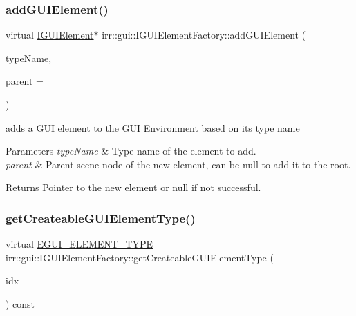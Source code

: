 \subsubsection{\texorpdfstring{add\+G\+U\+I\+Element()}{addGUIElement()}\hspace{0.1cm}{\footnotesize\ttfamily [2/2]}}
{\footnotesize\ttfamily virtual \hyperlink{classirr_1_1gui_1_1IGUIElement}{I\+G\+U\+I\+Element}$\ast$ irr\+::gui\+::\+I\+G\+U\+I\+Element\+Factory\+::add\+G\+U\+I\+Element (\begin{DoxyParamCaption}\item[{const \hyperlink{namespaceirr_a9395eaea339bcb546b319e9c96bf7410}{c8} $\ast$}]{type\+Name,  }\item[{\hyperlink{classirr_1_1gui_1_1IGUIElement}{I\+G\+U\+I\+Element} $\ast$}]{parent = {} }\end{DoxyParamCaption})\hspace{0.3cm}{\ttfamily [pure virtual]}}



adds a G\+UI element to the G\+UI Environment based on its type name 


\begin{DoxyParams}{Parameters}
{\em type\+Name} & Type name of the element to add. \\
\hline
{\em parent} & Parent scene node of the new element, can be null to add it to the root. \\
\hline
\end{DoxyParams}
\begin{DoxyReturn}{Returns}
Pointer to the new element or null if not successful. 
\end{DoxyReturn}
\mbox{\label{classirr_1_1gui_1_1IGUIElementFactory_a9318ddb2d0d971551db4c050c3f99a2f}} 
\subsubsection{\texorpdfstring{get\+Createable\+G\+U\+I\+Element\+Type()}{getCreateableGUIElementType()}}
{\footnotesize\ttfamily virtual \hyperlink{namespaceirr_1_1gui_ae4d66df0ecf4117cdbcf9f22404bd254}{E\+G\+U\+I\+\_\+\+E\+L\+E\+M\+E\+N\+T\+\_\+\+T\+Y\+PE} irr\+::gui\+::\+I\+G\+U\+I\+Element\+Factory\+::get\+Createable\+G\+U\+I\+Element\+Type (\begin{DoxyParamCaption}\item[{\hyperlink{namespaceirr_ac66849b7a6ed16e30ebede579f9b47c6}{s32}}]{idx }\end{DoxyParamCaption}) const\hspace{0.3cm}{\ttfamily [pure virtual]}}



